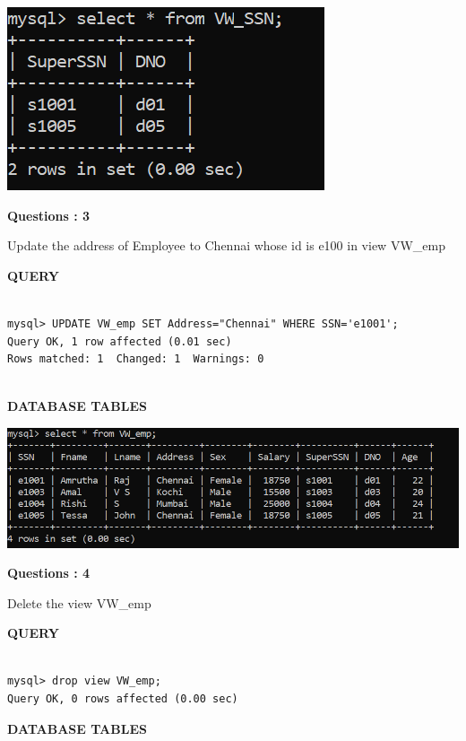 \documentclass[a4paper,12pt]{report}
\begin{document}
\includegraphics[scale=0.8]{Screenshot (479).png}
\begin{flushleft}
    \textbf{Questions : 3}
\end{flushleft}
Update the address of Employee to Chennai whose id is e100 in view VW\_emp
	\begin{flushleft}
		\textbf{QUERY }
	\end{flushleft}
 \begin{verbatim}
 
mysql> UPDATE VW_emp SET Address="Chennai" WHERE SSN='e1001';
Query OK, 1 row affected (0.01 sec)
Rows matched: 1  Changed: 1  Warnings: 0


\end{verbatim}
\begin{flushleft}
		\textbf{DATABASE TABLES} 
\end{flushleft} 

\includegraphics[scale=0.6]{Screenshot (480).png}
\begin{flushleft}
    \textbf{Questions : 4}
\end{flushleft}
Delete the view VW\_emp
	\begin{flushleft}
		\textbf{QUERY }
	\end{flushleft}
 \begin{verbatim}
 
mysql> drop view VW_emp;
Query OK, 0 rows affected (0.00 sec)

\end{verbatim}
\begin{flushleft}
		\textbf{DATABASE TABLES} 
\end{flushleft} 
\end{document}
